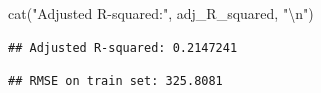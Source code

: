 \documentclass[
]{article}
\newenvironment{Shaded}{\begin{snugshade}}{\end{snugshade}}
\newcommand{\CommentTok}[1]{\textcolor[rgb]{0.56,0.35,0.01}{\textit{#1}}}
\newcommand{\DecValTok}[1]{\textcolor[rgb]{0.00,0.00,0.81}{#1}}
\newcommand{\FunctionTok}[1]{\textcolor[rgb]{0.00,0.00,0.00}{#1}}
\newcommand{\NormalTok}[1]{#1}
\newcommand{\OtherTok}[1]{\textcolor[rgb]{0.56,0.35,0.01}{#1}}
\newcommand{\SpecialCharTok}[1]{\textcolor[rgb]{0.00,0.00,0.00}{#1}}
\newcommand{\StringTok}[1]{\textcolor[rgb]{0.31,0.60,0.02}{#1}}
\begin{document}
\begin{Shaded}
\begin{Highlighting}[]
\FunctionTok{cat}\NormalTok{(}\StringTok{"Adjusted R{-}squared:"}\NormalTok{, adj\_R\_squared, }\StringTok{"}\SpecialCharTok{\textbackslash{}n}\StringTok{"}\NormalTok{)}
\end{Highlighting}
\end{Shaded}

\begin{verbatim}
## Adjusted R-squared: 0.2147241
\end{verbatim}

\begin{Shaded}
\end{Shaded}

\begin{verbatim}
## RMSE on train set: 325.8081
\end{verbatim}
\end{document}
